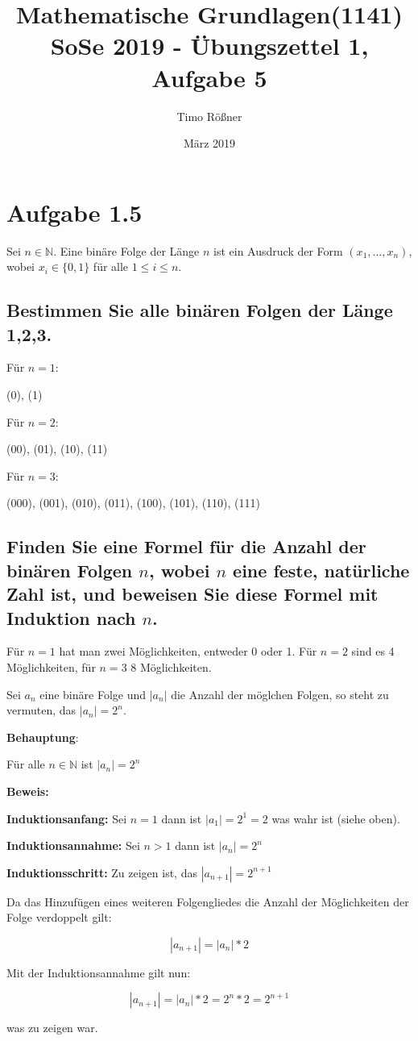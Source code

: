 \documentclass{article}
\title{Mathematische Grundlagen(1141) SoSe 2019 - Übungszettel 1, Aufgabe 5}
\author{Timo Rößner }
\date{März 2019}
\begin{document}
\maketitle

\section*{Aufgabe 1.5}

Sei \(n \in \mathbb{N}\). Eine binäre Folge der Länge \(n\) ist ein Ausdruck der Form \((x_{1}, ..., x_{n})\), wobei \(x_{i} \in \{0, 1\}\) für alle \(1 \leq i \leq n\).

\subsection*{Bestimmen Sie alle binären Folgen der Länge 1,2,3.}

Für \(n = 1\):

(0), (1)

Für \(n = 2\):

(00), (01), (10), (11)

Für \(n = 3\):

(000), (001), (010), (011), (100), (101), (110), (111)

\subsection*{ Finden Sie eine Formel für die Anzahl der binären Folgen \(n\), wobei \(n\) eine feste, natürliche Zahl ist, und beweisen Sie diese Formel mit Induktion nach \(n\).}

Für \(n = 1\) hat man zwei Möglichkeiten, entweder 0 oder 1. Für \(n = 2\) sind es 4 Möglichkeiten, für \(n = 3\) 8 Möglichkeiten.

Sei \(a_{n}\) eine binäre Folge und \(|a_{n}|\) die Anzahl der möglchen Folgen, so steht zu vermuten, das \(|a_{n}| = 2^{n}\).

\textbf{Behauptung}:

Für alle \(n \in \mathbb{N}\) ist \(|a_{n}| = 2^{n}\)

\textbf{Beweis:}

\textbf{Induktionsanfang:} Sei \(n = 1\) dann ist \(|a_{1}| = 2^{1} = 2\) was wahr ist (siehe oben).

\textbf{Induktionsannahme:} Sei \(n > 1\) dann ist \(|a_{n}| = 2^{n}\)

\textbf{Induktionsschritt:} Zu zeigen ist, das \(|a_{n+1}| = 2^{n+1}\)

Da das Hinzufügen eines weiteren Folgengliedes die Anzahl der Möglichkeiten der Folge verdoppelt gilt:

\[
|a_{n+1}| = |a_{n}| * 2
\]

Mit der Induktionsannahme gilt nun:

\[
|a_{n+1}| = |a_{n}| * 2 = 2^{n} * 2 = 2^{n+1}
\]

was zu zeigen war.
\end{document}
